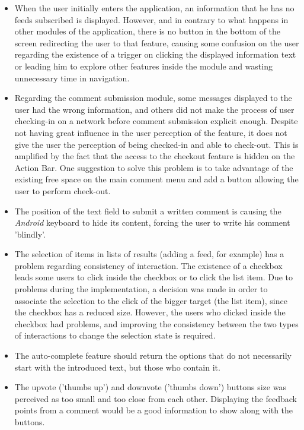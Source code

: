 \begin{itemize}
\item When the user initially enters the application, an information that he has no feeds subscribed is displayed. However, and in contrary to what happens in other modules of the application, there is no button in the bottom of the screen redirecting the user to that feature, causing some confusion on the user regarding the existence of a trigger on clicking the displayed information text or leading him to explore other features inside the module and wasting unnecessary time in navigation.

\item Regarding the comment submission module, some messages displayed to the user had the wrong information, and others did not make the process of user checking-in on a network before comment submission explicit enough. Despite not having great influence in the user perception of the feature, it does not give the user the perception of being checked-in and able to check-out. This is amplified by the fact that the access to the checkout feature is hidden on the Action Bar.
One suggestion to solve this problem is to take advantage of the existing free space on the main comment menu and add a button allowing the user to perform check-out.

\item The position of the text field to submit a written comment is causing the \emph{Android} keyboard to hide its content, forcing the user to write his comment 'blindly'.

\item The selection of items in lists of results (adding a feed, for example) has a problem regarding consistency of interaction. The existence of a checkbox leads some users to click inside the checkbox or to click the list item. Due to problems during the implementation, a decision was made in order to associate the selection to the click of the bigger target (the list item), since the checkbox has a reduced size. However, the users who clicked inside the checkbox had problems, and improving the consistency between the two types of interactions to change the selection state is required.

\item The auto-complete feature should return the options that do not necessarily start with the introduced text, but those who contain it.

\item The upvote ('thumbs up') and downvote ('thumbs down') buttons size was perceived as too small and too close from each other. Displaying the feedback points from a comment would be a good information to show along with the buttons.


\end{itemize}
